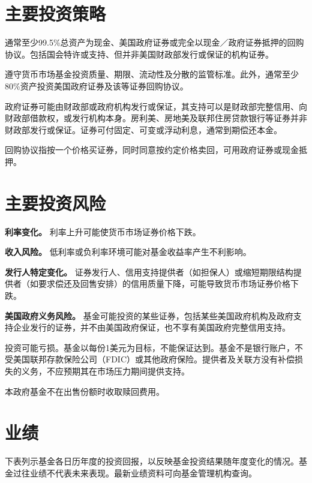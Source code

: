 \documentclass[UTF8,fontset=none,11pt,a4paper]{ctexart}
\begin{document}
\section*{主要投资策略}
通常至少99.5\%总资产为现金、美国政府证券或完全以现金／政府证券抵押的回购协议。包括国会特许或支持、但并非美国财政部发行或保证的\allowbreak\mbox{机构证券。}


遵守货币市场基金投资质量、期限、流动性及分散的监管标准。此外，通常至少80\%资产投资美国政府证券及该等证券\allowbreak\mbox{回购协议。}


政府证券可能由财政部或政府机构发行或保证，其支持可以是财政部完整信用、向财政部借款权，或发行机构本身。房利美、房地美及联邦住房贷款银行等证券并非财政部发行或保证。证券可付固定、可变或浮动利息，通常到期\allowbreak\mbox{偿还本金。}


回购协议指按一个价格买证券，同时同意按约定价格卖回，可用政府证券或\allowbreak\mbox{现金抵押。}


\section*{主要投资风险}
\textbf{利率变化。} 利率上升可能使货币市场证券\allowbreak\mbox{价格下跌。}


\textbf{收入风险。} 低利率或负利率环境可能对基金收益率产生\allowbreak\mbox{不利影响。}


\textbf{发行人特定变化。} 证券发行人、信用支持提供者（如担保人）或缩短期限结构提供者（如要求偿还及回售安排）的信用质量下降，可能导致货币市场证券\allowbreak\mbox{价格下跌。}


\textbf{美国政府义务风险。} 基金可能投资的某些证券，包括某些美国政府机构及政府支持企业发行的证券，并不由美国政府保证，也不享有美国政府完整\allowbreak\mbox{信用支持。}


投资可能亏损。基金以每份1美元为目标，不能保证达到。基金不是银行账户，不受美国联邦存款保险公司（FDIC）或其他政府保险。提供者及关联方没有补偿损失的义务，不应预期其在市场压力期间提\allowbreak\mbox{供支持。}


本政府基金不在出售份额时收取\allowbreak\mbox{赎回费用。}


\section*{业绩}
下表列示基金各日历年度的投资回报，以反映基金投资结果随年度变化的情况。基金过往业绩不代表未来表现。最新业绩资料可向基金管理\allowbreak\mbox{机构查询。}
\end{document}
